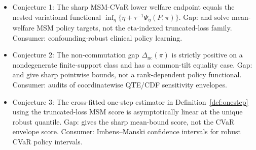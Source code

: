 \documentclass[11pt]{article}
\theoremstyle{definition}
\theoremstyle{plain}
\theoremstyle{remark}
\begin{document}
\begin{itemize}[leftmargin=2em]
\item Conjecture 1: The sharp MSM-CVaR lower welfare endpoint equals the nested variational functional \(\inf_\eta\{\eta+\tau^{-1}\Psi_\eta(P,\pi)\}\). Gap: \citet{HessFrauenMelnychukFeuerriegel2025SharpOPE} and \citet{JinXuZhengZhou2025RobustEfficientPolicy} solve mean-welfare MSM policy targets, not the eta-indexed truncated-loss family. Consumer: confounding-robust clinical policy learning.
\item Conjecture 2: The non-commutation gap \(\Delta_{\mathrm{nc}}(\pi)\) is strictly positive on a nondegenerate finite-support class and has a common-tilt equality case. Gap: \citet{DornGuo2021QuantileBalancing} and \citet{MastenPoirierRen2025RelaxingUnconfoundedness} give sharp pointwise bounds, not a rank-dependent policy functional. Consumer: audits of coordinatewise QTE/CDF sensitivity envelopes.
\item Conjecture 3: The cross-fitted one-step estimator in Definition~\ref{def:onestep} using the truncated-loss MSM score is asymptotically linear at the unique robust quantile. Gap: \citet{DornGuoKallus2021DoublySharp} gives the sharp mean-bound score, not the CVaR envelope score. Consumer: Imbens--Manski confidence intervals for robust CVaR policy intervals.
\end{itemize}
\end{document}
